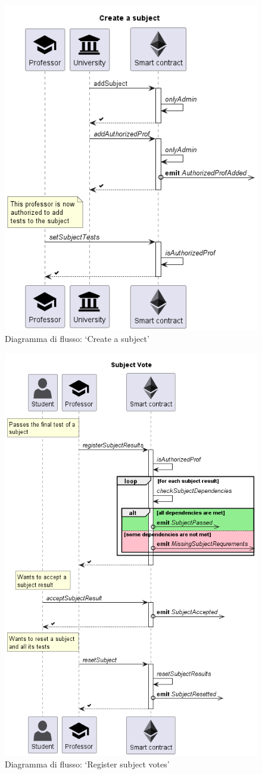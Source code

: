 \begin{figure}
    \centering
    \includegraphics[width=0.70\columnwidth]{img/CreateSubject.png}
    \caption{Diagramma di flusso: `Create a subject'}
    \label{fig:createSubject}
\end{figure}

\begin{figure}
    \centering
    \includegraphics[width=0.85\columnwidth]{img/SubjectVote.png}
    \caption{Diagramma di flusso: `Register subject votes'}
    \label{fig:registerSubjectVotes}
\end{figure}

